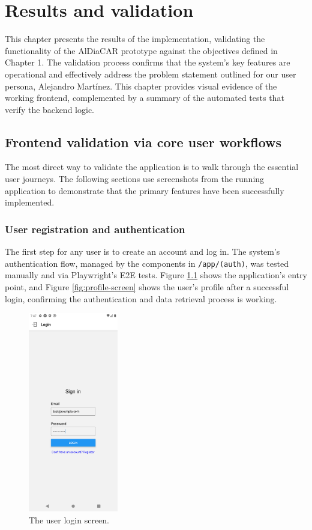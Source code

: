 \chapter{Results and validation}

This chapter presents the results of the implementation, validating the functionality of the AlDiaCAR prototype against the objectives defined in Chapter 1. The validation process confirms that the system's key features are operational and effectively address the problem statement outlined for our user persona, Alejandro Martínez. This chapter provides visual evidence of the working frontend, complemented by a summary of the automated tests that verify the backend logic.

\section{Frontend validation via core user workflows}

The most direct way to validate the application is to walk through the essential user journeys. The following sections use screenshots from the running application to demonstrate that the primary features have been successfully implemented.

\subsection{User registration and authentication}
The first step for any user is to create an account and log in. The system's authentication flow, managed by the components in \texttt{/app/(auth)}, was tested manually and via Playwright's E2E tests. Figure \ref{fig:login-screen} shows the application's entry point, and Figure \ref{fig:profile-screen} shows the user's profile after a successful login, confirming the authentication and data retrieval process is working.

\begin{figure}[H]
    \centering
    \includegraphics[width=0.35\textwidth]{images/mobile/login.png}
    \caption{The user login screen.}
    \label{fig:login-screen}
\end{figure}

